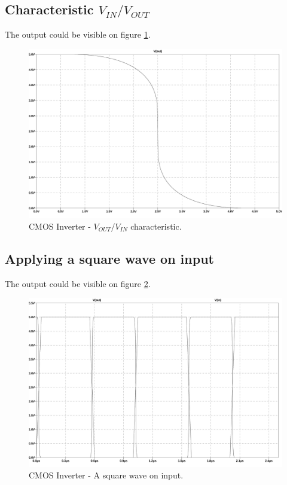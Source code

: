\subsection{Characteristic $V_{IN}/V_{OUT}$}

The output could be visible on figure \ref{characteristic}.
\begin{figure}[h]
  \centering
  \includegraphics[width=14cm]{graph/CMOSInverter/Characteristic.jpg}
  \caption{CMOS Inverter - $V_{OUT}/V_{IN}$ characteristic.}
  \label{characteristic}
\end{figure}

\subsection{Applying a square wave on input}

The output could be visible on figure \ref{SquareWave}.
\begin{figure}[h]
  \centering
  \includegraphics[width=14cm]{graph/CMOSInverter/SquareWave.jpg}
  \caption{CMOS Inverter - A square wave on input.}
  \label{SquareWave}
\end{figure}

